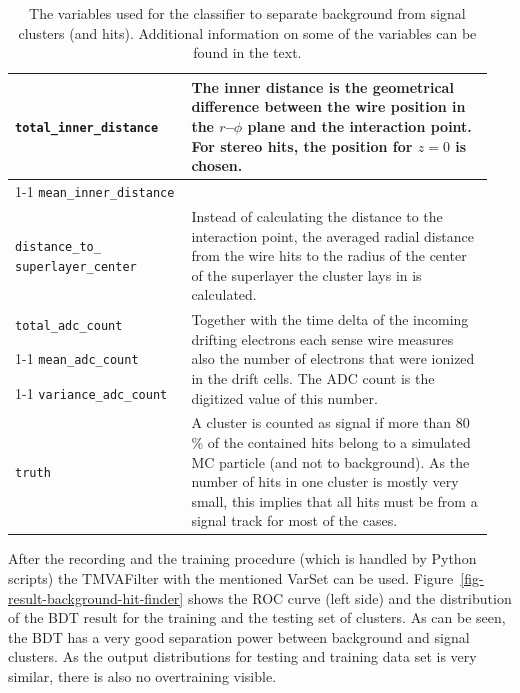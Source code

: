 \begin{table}
\begin{tabular}{p{0.35\linewidth}p{0.6\linewidth}}
   \verb+total_inner_distance+ & \multirow{3}{*}[-1.5pt]{\begin{minipage}{\linewidth} The inner distance is the geometrical difference between the wire position in the $r$--$\phi$ plane and the interaction point. For stereo hits, the position for $z = 0$ is chosen. \end{minipage}} \\[1ex] \cmidrule{1-1}
   \verb+mean_inner_distance+ & \\[1ex] \midrule
   \verb+distance_to_+ \verb+superlayer_center+ & Instead of calculating the distance to the interaction point, the averaged radial distance from the wire hits to the radius of the center of the superlayer the cluster lays in is calculated. \\ \midrule 
   
   \verb+total_adc_count+ & \multirow{3}{*}[-1pt]{\begin{minipage}{\linewidth} Together with the time delta of the incoming drifting electrons each sense wire measures also the number of electrons that were ionized in the drift cells. The ADC count is the digitized value of this number. \end{minipage}} \\ \cmidrule{1-1}
   \verb+mean_adc_count+ & \\ \cmidrule{1-1}
   \verb+variance_adc_count+ & \\ \midrule
   \verb+truth+ & A cluster is counted as signal if more than 80 \% of the contained hits belong to a simulated MC particle (and not to background). As the number of hits in one cluster is mostly very small, this implies that all hits must be from a signal track for most of the cases. \\ \bottomrule
  \end{tabular}

  \caption{The variables used for the classifier to separate background from signal clusters (and hits). Additional information on some of the variables can be found in the text.}
  \label{tab-varset-cluster}
\end{table}

After the recording and the training procedure (which is handled by Python scripts) the TMVAFilter with the mentioned VarSet can be used. Figure~\ref{fig-result-background-hit-finder} shows the ROC curve (left side) and the distribution of the BDT result for the training and the testing set of clusters. As can be seen, the BDT has a very good separation power between background and signal clusters. As the output distributions for testing and training data set is very similar, there is also no overtraining visible.

